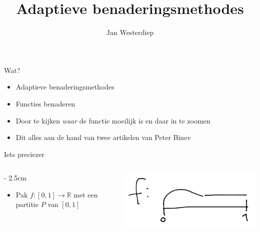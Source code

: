 \documentclass{beamer}
\title{Adaptieve benaderingsmethodes}
\author{Jan Westerdiep}
\newcommand{\R}{\mathbb{R}}
\begin{document}
\begin{frame}
\titlepage
\end{frame}

\begin{frame}{Wat?}
\begin{itemize}
  \item \alert<3>{Adaptieve} \alert<2>{benaderingsmethodes} \pause
  \item Functies benaderen \pause
  \item Door te kijken \emph{waar} de functie moeilijk is en daar in te zoomen \pause
  \item Dit alles aan de hand van twee artikelen van Peter Binev
\end{itemize}
\end{frame}

\begin{frame}{Iets preciezer}
\begin{columns}[t]
\begin{column}[T]{\linewidth - 2.5cm}
\begin{itemize}
  \item Pak $f: [0,1] \to \R$ met een partitie $P$ van $[0,1]$
\end{itemize}
\end{column}
\begin{column}[T]{2.5cm}
  \centering
  \includegraphics[width=\linewidth]{schets_0.png}\\

\end{column}
\end{columns}
\end{frame}
\end{document}

